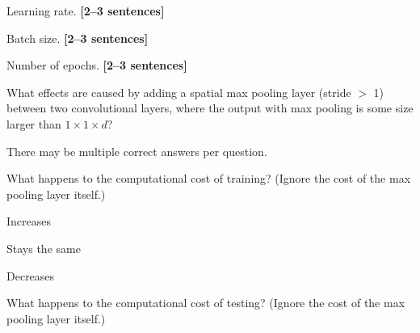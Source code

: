 \documentclass{csci1430}
\begin{document}
\begin{subquestion}[points=2]
Learning rate. \textbf{[2--3 sentences]}
\end{subquestion}

\begin{answer}[height=12]

\end{answer}


\begin{subquestion}[points=2]
Batch size. \textbf{[2--3 sentences]}
\end{subquestion}

\begin{answer}[height=12]

\end{answer}


\pagebreak
\begin{subquestion}[points=2]
Number of epochs. \textbf{[2--3 sentences]}
\end{subquestion}

\begin{answer}[height=12]

\end{answer}


\pagebreak
\begin{question}[points=10,drawbox=false] 
What effects are caused by adding a spatial max pooling layer (stride $>$ 1) between two convolutional layers, where the output with max pooling is some size larger than $1 \times 1 \times d$?

There may be multiple correct answers per question.
\end{question}

\begin{subquestion}[points=1]
What happens to the computational cost of training? (Ignore the cost of the max pooling layer itself.)
\end{subquestion}    

\begin{answerlist}
    \item Increases %
    \item Stays the same
    \item Decreases
\end{answerlist}
    
\begin{subquestion}[points=1]
What happens to the computational cost of testing? (Ignore the cost of the max pooling layer itself.)
\end{subquestion}    
\end{document}
